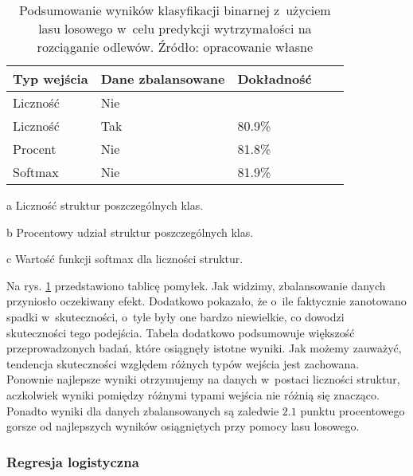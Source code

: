 \begin{table}[h]
	\centering
	\begin{threeparttable}
		\caption{Podsumowanie wyników klasyfikacji binarnej z~użyciem lasu losowego w~celu predykcji wytrzymałości na rozciąganie odlewów. Źródło: opracowanie własne}
		\label{rfc.binary.summary.table}
		\begin{tabularx}{1\textwidth}{ |X|X|X|X|X| }
		  \hline
		  \textbf{Typ wejścia} & \textbf{Dane zbalansowane} & \textbf{Dokładność}\\

		  \hline
		  Liczność\tnote{a} & Nie  & \bo{83\%} \\

		  \hline
		  Liczność & Tak & 80.9\%\\

		  \hline
  		  Procent\tnote{b} & Nie & 81.8\%\\

	          \hline
  		  Softmax\tnote{c} & Nie & 81.9\%\\

		  \hline
		\end{tabularx}
		\begin{tablenotes}
			\footnotesize
			\item[a] Liczność struktur poszczególnych klas.
			\item[b] Procentowy udział struktur poszczególnych klas.
			\item[c] Wartość funkcji softmax dla liczności struktur.
		\end{tablenotes}
	\end{threeparttable}
\end{table}
Na rys. \ref{rfc.binary.summary.table} przedstawiono tablicę pomyłek. Jak widzimy, zbalansowanie danych przyniosło oczekiwany efekt. Dodatkowo pokazało, że o~ile faktycznie zanotowano spadki w~skuteczności, o~tyle były one bardzo niewielkie, co dowodzi skuteczności tego podejścia. 
Tabela dodatkowo podsumowuje większość przeprowadzonych badań, które osiągnęły istotne wyniki.
Jak możemy zauważyć, tendencja skuteczności względem różnych typów wejścia jest zachowana. Ponownie najlepsze wyniki otrzymujemy na danych w~postaci liczności struktur, aczkolwiek wyniki pomiędzy różnymi typami wejścia nie różnią się znacząco. Ponadto wyniki dla danych zbalansowanych są zaledwie $2.1$ punktu procentowego gorsze od najlepszych wyników osiągniętych przy pomocy lasu losowego. 

\subsubsection{Regresja logistyczna}
\label{structures.with.logit}

